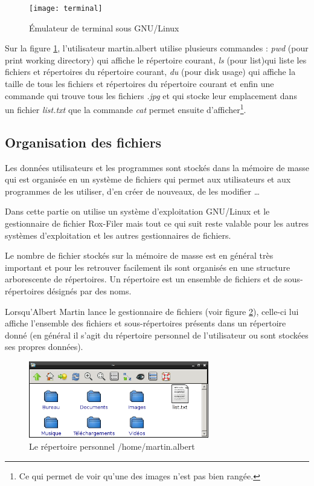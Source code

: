 \begin{figure}[ht]
  \centering
  \texttt{[image: terminal]}
  \caption{\footnotesize{Émulateur de terminal sous GNU/Linux}}
  \label{fig:shelltexte}
\end{figure}
Sur la figure \ref{fig:shelltexte}, l'utilisateur martin.albert utilise plusieurs commandes : \emph{pwd} (pour print working directory) qui affiche le répertoire courant, \emph{ls} (pour list)qui liste les fichiers et répertoires du répertoire courant, \emph{du} (pour disk usage) qui affiche la taille de tous les fichiers et répertoires du répertoire courant et enfin une commande qui trouve tous les fichiers \emph{.jpg} et qui stocke leur emplacement dans un fichier \emph{list.txt} que la commande \emph{cat} permet ensuite d'afficher\footnote{Ce qui permet de voir qu'une des images n'est pas bien rangée.}.
\subsection{Organisation des fichiers}
Les données utilisateurs et les programmes sont stockés dans la mémoire de masse qui est organisée en un système de fichiers qui permet aux utilisateurs et aux programmes de les utiliser, d'en créer de nouveaux, de les modifier \dots\par
Dans cette partie on utilise un système d'exploitation GNU/Linux et le gestionnaire de fichier Rox-Filer mais tout ce qui suit reste valable pour les autres systèmes d'exploitation et les autres gestionnaires de fichiers.\par
Le nombre de fichier stockés sur la mémoire de masse est en général très important et pour les retrouver facilement ils sont organisés en une structure arborescente de répertoires. Un répertoire est un ensemble de fichiers et de sous-répertoires désignés par des noms.\par
Lorsqu'Albert Martin lance le gestionnaire de fichiers (voir figure \ref{fig:rox1}), celle-ci lui affiche l'ensemble des fichiers et sous-répertoires présents dans un répertoire donné (en général il s'agit du répertoire personnel de l'utilisateur ou sont stockées ses propres données).
\begin{figure}[ht]
  \centering
  \includegraphics[width=0.7\textwidth]{rox1}
  \caption{\footnotesize{Le répertoire personnel /home/martin.albert}}
  \label{fig:rox1}
\end{figure}
